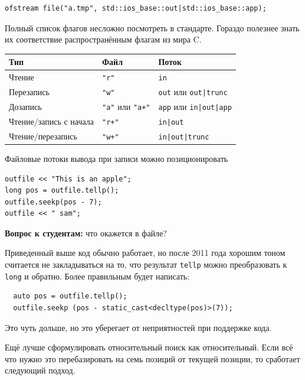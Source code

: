\documentclass[a4paper,12pt,oneside]{article}
\newif\ifanswers
\begin{document}
\begin{lstlisting}
ofstream file("a.tmp", std::ios_base::out|std::ios_base::app);
\end{lstlisting}

Полный список флагов несложно посмотреть в стандарте. Гораздо полезнее знать их соответствие распространённым флагам из мира C.

\begin{center}
\begin{tabular}{ | l | l | l | }
  \hline
  Тип & Файл & Поток \\ \hline
  Чтение & \lstinline!"r"! & \lstinline!in! \\
  Перезапись & \lstinline!"w"! & \lstinline!out! или \lstinline!out|trunc! \\
  Дозапись & \lstinline!"a"! или \lstinline!"a+"! & \lstinline!app! или \lstinline!in|out|app! \\
  Чтение/запись с начала & \lstinline!"r+"! & \lstinline!in|out! \\
  Чтение/перезапись & \lstinline!"w+"! & \lstinline!in|out|trunc! \\
  \hline
\end{tabular}
\end{center}

Файловые потоки вывода при записи можно позиционировать

\begin{lstlisting}
outfile << "This is an apple";
long pos = outfile.tellp();
outfile.seekp(pos - 7);
outfile << " sam";
\end{lstlisting}

\textbf{Вопрос к студентам:} что окажется в файле?

\ifanswers
Правильный ответ: this is a sample
\fi

Приведенный выше код обычно работает, но после 2011 года хорошим тоном считается не закладываться на то, что результат \lstinline!tellp! можно преобразовать к \lstinline!long! и обратно. Более правильным будет написать:

\begin{lstlisting}
  auto pos = outfile.tellp();
  outfile.seekp (pos - static_cast<decltype(pos)>(7));
\end{lstlisting}

Это чуть дольше, но это уберегает от неприятностей при поддержке кода.

Ещё лучше сформулировать относительный поиск как относительный. Если всё что нужно это перебазировать на семь позиций от текущей позиции, то сработает следующий подход.
\end{document}

